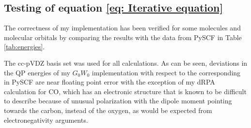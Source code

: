 \documentclass[12pt]{caltech_thesis}
\begin{document}
\subsection{Testing of equation \ref{eq: Iterative equation}}
The correctness of my implementation has been verified for some molecules and molecular orbitals by comparing the results with the data from PySCF in Table \ref{tab:energies}.
\begin{table}[h]
\centering
\caption{Deviation in quasi-particle energies for four molecules using the $G_0W_0$ self-energy either evaluated within the dTDA or dRPA relative to PySCF (all values converted to $\mathrm{eV}$)}
\label{tab:energies}
\end{table}


The cc-pVDZ basis set was used for all calculations. As can be seen, deviations in the QP energies of my $G_0W_0$ implementation with respect to the corresponding in PySCF are near floating point error with the exception of my dRPA calculation for $\mathrm{CO}$, which has an electronic structure that is known to be difficult to describe because of unusual polarization with the dipole moment pointing towards the carbon, instead of the oxygen, as would be expected from electronegativity arguments. \autocite{frenking2007electronic}
\end{document}
